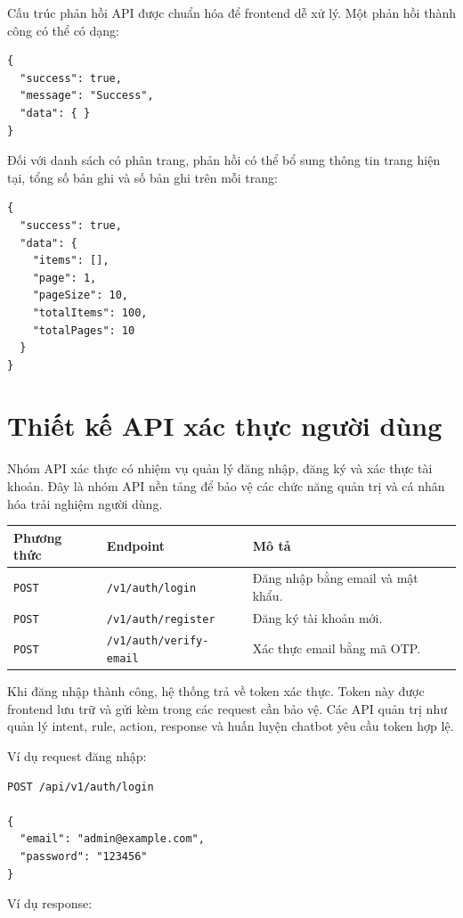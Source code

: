 Cấu trúc phản hồi API được chuẩn hóa để frontend dễ xử lý. Một phản hồi thành công có thể có dạng:

\begin{verbatim}
{
  "success": true,
  "message": "Success",
  "data": { }
}
\end{verbatim}

Đối với danh sách có phân trang, phản hồi có thể bổ sung thông tin trang hiện tại, tổng số bản ghi và số bản ghi trên mỗi trang:

\begin{verbatim}
{
  "success": true,
  "data": {
    "items": [],
    "page": 1,
    "pageSize": 10,
    "totalItems": 100,
    "totalPages": 10
  }
}
\end{verbatim}

\section{Thiết kế API xác thực người dùng}

Nhóm API xác thực có nhiệm vụ quản lý đăng nhập, đăng ký và xác thực tài khoản. Đây là nhóm API nền tảng để bảo vệ các chức năng quản trị và cá nhân hóa trải nghiệm người dùng.

\begin{longtable}{|p{3cm}|p{5cm}|p{7cm}|}
\hline
\textbf{Phương thức} & \textbf{Endpoint} & \textbf{Mô tả} \\
\hline
\texttt{POST} & \texttt{/v1/auth/login} & Đăng nhập bằng email và mật khẩu. \\
\hline
\texttt{POST} & \texttt{/v1/auth/register} & Đăng ký tài khoản mới. \\
\hline
\texttt{POST} & \texttt{/v1/auth/verify-email} & Xác thực email bằng mã OTP. \\
\hline
\end{longtable}

Khi đăng nhập thành công, hệ thống trả về token xác thực. Token này được frontend lưu trữ và gửi kèm trong các request cần bảo vệ. Các API quản trị như quản lý intent, rule, action, response và huấn luyện chatbot yêu cầu token hợp lệ.

Ví dụ request đăng nhập:

\begin{verbatim}
POST /api/v1/auth/login

{
  "email": "admin@example.com",
  "password": "123456"
}
\end{verbatim}

Ví dụ response:

